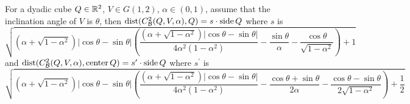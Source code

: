 \begin{lemma}
    For a dyadic cube $Q\in \mathbb{R}^2$, $V\in G(1,2)$, $\alpha\in(0,1)$, assume that the inclination angle of $V$ is $\theta$, then $\operatorname{dist}(C_\mathcal B^2(Q, V, \alpha), Q) = s\cdot \operatorname{side} Q$ where $s$ is
    \begin{equation*}
        \sqrt{ \left(\alpha + \sqrt{1-\alpha^2} \right)|\cos \theta-\sin\theta| \left(  \frac{\left(\alpha + \sqrt{1-\alpha^2} \right)|\cos \theta-\sin\theta|}{4\alpha^2(1-\alpha^2)} - \frac{\sin\theta}{\alpha} -\frac{\cos\theta}{\sqrt{1-\alpha^2}}  \right) + 1}
    \end{equation*}
    and $\operatorname{dist}(C_\mathcal B^2(Q, V, \alpha), \operatorname{center} Q) = s^\prime \cdot \operatorname{side} Q$ where $s^\prime$ is 
    \begin{equation*}
        \sqrt{ \left(\alpha + \sqrt{1-\alpha^2} \right)|\cos \theta-\sin\theta|\left( \frac{\left(\alpha + \sqrt{1-\alpha^2} \right)|\cos \theta-\sin\theta|}{4\alpha^2(1-\alpha^2)} - \frac{\cos\theta + \sin\theta}{2\alpha} - \frac{\cos\theta-\sin\theta}{2\sqrt{1-\alpha^2}}  \right) + \frac{1}{2}}
    \end{equation*}
\end{lemma}
